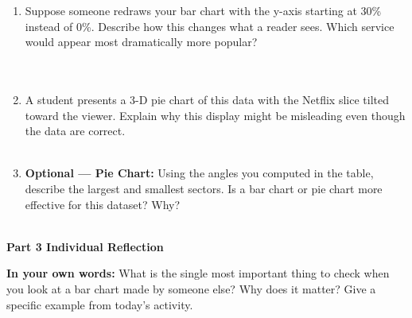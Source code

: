 \documentclass[10pt]{article}
\begin{document}
\begin{enumerate}[leftmargin=1.5em, itemsep=8pt]

  \item Suppose someone redraws your bar chart with the y-axis starting at 30\%
        instead of 0\%. Describe how this changes what a reader sees. Which service
        would appear most dramatically more popular?\\[5pt]
        \writeline\\[1pt]\writeline\\[1pt]\writeline

  \item A student presents a 3-D pie chart of this data with the Netflix slice
        tilted toward the viewer. Explain why this display might be misleading
        even though the data are correct.\\[5pt]
        \writeline\\[1pt]\writeline

  \item \textbf{Optional --- Pie Chart:} Using the angles you computed in the table,
        describe the largest and smallest sectors. Is a bar chart or pie chart more
        effective for this dataset? Why?\\[5pt]
        \writeline\\[1pt]\writeline

\end{enumerate}

\vspace{0.14in}

{\large\bfseries\color{navy} Part 3 \quad Individual Reflection}

\vspace{0.1in}

\begin{tcolorbox}[colback=goldbg, colframe=goldacc, boxrule=0.8pt, arc=2mm,
    left=3mm, right=3mm, top=2mm, bottom=2mm]
\small\textbf{In your own words:} What is the single most important thing to check
when you look at a bar chart made by someone else? Why does it matter?
Give a specific example from today's activity.\\[6pt]
\writeline\\[1pt]\writeline\\[1pt]\writeline
\end{tcolorbox}
\end{document}
